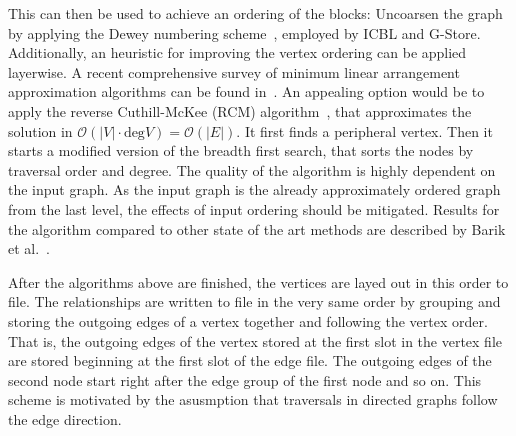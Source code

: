         This can then be used to achieve an ordering of the blocks:
        Uncoarsen the graph by applying the Dewey numbering scheme~\autocite{dewey1894decimal}, employed by ICBL and G-Store.
        Additionally, an heuristic for improving the vertex ordering can be applied layerwise. 
        A recent comprehensive survey of minimum linear arrangement approximation algorithms can be found in~\autocite{barik2020vertex}.
        An appealing option would be to apply the reverse Cuthill-McKee (RCM) algorithm~\autocite{Cuthill1969ReducingTB}, that approximates the solution in $\mathcal{O}(|V| \cdot \text{deg}{V}) = \mathcal{O}(|E|)$. 
        It first finds a peripheral vertex.
        Then it starts a modified version of the breadth first search, that sorts the nodes by traversal order and degree.
        The quality of the algorithm is highly dependent on the input graph.
        As the input graph is the already approximately ordered graph from the last level, the effects of input ordering should be mitigated.
        Results for the algorithm compared to other state of the art methods are described by Barik et al.~\autocite{barik2020vertex}.
        
        After the algorithms above are finished, the vertices are layed out in this order to file. 
        The relationships are written to file in the very same order by grouping and storing the outgoing edges of a vertex together and following the vertex order.
        That is, the outgoing edges of the vertex stored at the first slot in the vertex file are stored beginning at the first slot of the edge file. 
        The outgoing edges of the second node start right after the edge group of the first node and so on.
        This scheme is motivated by the asusmption that traversals in directed graphs follow the edge direction.
